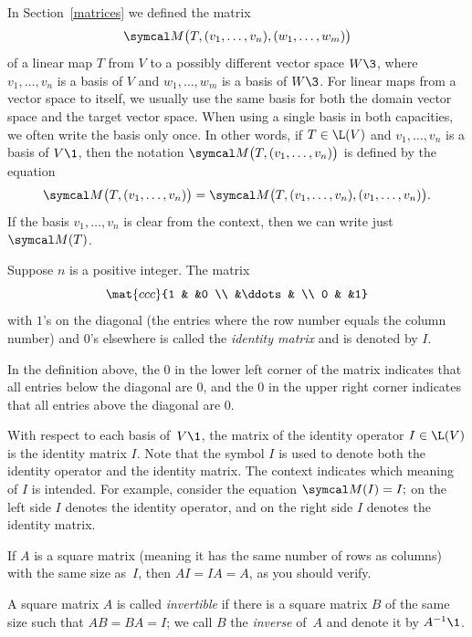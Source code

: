 In Section~\ref{matrices} we defined the matrix
\[
\M\bigl(T, (v_1, \dots, v_n), (w_1, \dots, w_m) \bigr)
\]
of a linear map $T$ from $V$ to a possibly different vector space $W\3$, where $v_1, \dots, v_n$ is a basis of $V$ and $w_1, \dots, w_m$ is a basis of $W\3$. For  linear maps from a vector space to itself, we usually use the same basis for both the domain vector space and the target vector space. When using a single basis in both capacities, we often write the basis only once. In other words, if $T \in \L(V)$ and $v_1, \dots, v_n$ is a basis of $V\1$, then the notation $\M\paren[\big]{ T, (v_1, \ldots, v_n) }$ is defined by the equation
\[
\M\paren[\big]{ T, (v_1, \ldots, v_n) } = \M\paren[\big]{ T, (v_1, \ldots, v_n), (v_1, \ldots, v_n) }.
\]
If the basis $v_1, \ldots, v_n$ is clear from the context, then we can write just $\M(T)$.

{Suppose $n$ is a positive integer. The  matrix
\[
\mat{ccc}{1 & &0 \\ &\ddots & \\ 0 & &1}
\]
with $1$'s on the diagonal (the entries where the row number equals the column number) and $0$'s elsewhere is called the \emph{identity matrix} and is denoted by $I$.}

In the definition above, the $0$ in the lower left corner of the matrix indicates that all entries below the diagonal are $0$, and the $0$ in the upper right corner indicates that all entries above the diagonal are $0$.

With respect to each basis of~$V\1$, the matrix of the identity operator $I \in \L(V)$ is the identity matrix $I$. Note that the symbol $I$ is used to denote both the identity operator and the identity matrix. The context indicates which meaning of $I$ is
intended.  For example, consider the equation
$
\M(I) = I;
$
on the left side $I$ denotes the identity operator, and on the right side $I$
denotes the identity matrix.

If $A$ is a square matrix (meaning it has the same number of rows as columns) with the same size as~$I$, then $AI = IA = A$, as you should verify.

{A square matrix $A$ is called
\emph{invertible}
if there is a square matrix $B$ of the same size such that $AB = BA = I$; we call $B$ the \emph{inverse} of~$A$ and denote it by $A^{-1}\1$.}


